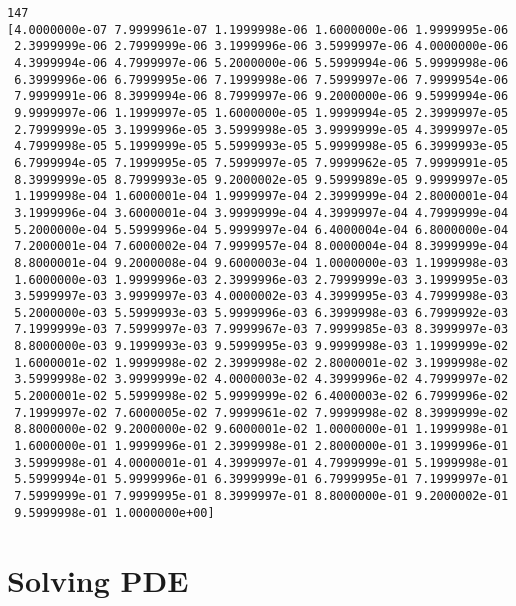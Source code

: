 \documentclass[11pt]{article}
\begin{document}
    \begin{Verbatim}[commandchars=\\\{\}]
147
[4.0000000e-07 7.9999961e-07 1.1999998e-06 1.6000000e-06 1.9999995e-06
 2.3999999e-06 2.7999999e-06 3.1999996e-06 3.5999997e-06 4.0000000e-06
 4.3999994e-06 4.7999997e-06 5.2000000e-06 5.5999994e-06 5.9999998e-06
 6.3999996e-06 6.7999995e-06 7.1999998e-06 7.5999997e-06 7.9999954e-06
 7.9999991e-06 8.3999994e-06 8.7999997e-06 9.2000000e-06 9.5999994e-06
 9.9999997e-06 1.1999997e-05 1.6000000e-05 1.9999994e-05 2.3999997e-05
 2.7999999e-05 3.1999996e-05 3.5999998e-05 3.9999999e-05 4.3999997e-05
 4.7999998e-05 5.1999999e-05 5.5999993e-05 5.9999998e-05 6.3999993e-05
 6.7999994e-05 7.1999995e-05 7.5999997e-05 7.9999962e-05 7.9999991e-05
 8.3999999e-05 8.7999993e-05 9.2000002e-05 9.5999989e-05 9.9999997e-05
 1.1999998e-04 1.6000001e-04 1.9999997e-04 2.3999999e-04 2.8000001e-04
 3.1999996e-04 3.6000001e-04 3.9999999e-04 4.3999997e-04 4.7999999e-04
 5.2000000e-04 5.5999996e-04 5.9999997e-04 6.4000004e-04 6.8000000e-04
 7.2000001e-04 7.6000002e-04 7.9999957e-04 8.0000004e-04 8.3999999e-04
 8.8000001e-04 9.2000008e-04 9.6000003e-04 1.0000000e-03 1.1999998e-03
 1.6000000e-03 1.9999996e-03 2.3999996e-03 2.7999999e-03 3.1999995e-03
 3.5999997e-03 3.9999997e-03 4.0000002e-03 4.3999995e-03 4.7999998e-03
 5.2000000e-03 5.5999993e-03 5.9999996e-03 6.3999998e-03 6.7999992e-03
 7.1999999e-03 7.5999997e-03 7.9999967e-03 7.9999985e-03 8.3999997e-03
 8.8000000e-03 9.1999993e-03 9.5999995e-03 9.9999998e-03 1.1999999e-02
 1.6000001e-02 1.9999998e-02 2.3999998e-02 2.8000001e-02 3.1999998e-02
 3.5999998e-02 3.9999999e-02 4.0000003e-02 4.3999996e-02 4.7999997e-02
 5.2000001e-02 5.5999998e-02 5.9999999e-02 6.4000003e-02 6.7999996e-02
 7.1999997e-02 7.6000005e-02 7.9999961e-02 7.9999998e-02 8.3999999e-02
 8.8000000e-02 9.2000000e-02 9.6000001e-02 1.0000000e-01 1.1999998e-01
 1.6000000e-01 1.9999996e-01 2.3999998e-01 2.8000000e-01 3.1999996e-01
 3.5999998e-01 4.0000001e-01 4.3999997e-01 4.7999999e-01 5.1999998e-01
 5.5999994e-01 5.9999996e-01 6.3999999e-01 6.7999995e-01 7.1999997e-01
 7.5999999e-01 7.9999995e-01 8.3999997e-01 8.8000000e-01 9.2000002e-01
 9.5999998e-01 1.0000000e+00]
    \end{Verbatim}

    \hypertarget{solving-pde}{%
\section{Solving PDE}\label{solving-pde}}
\end{document}
